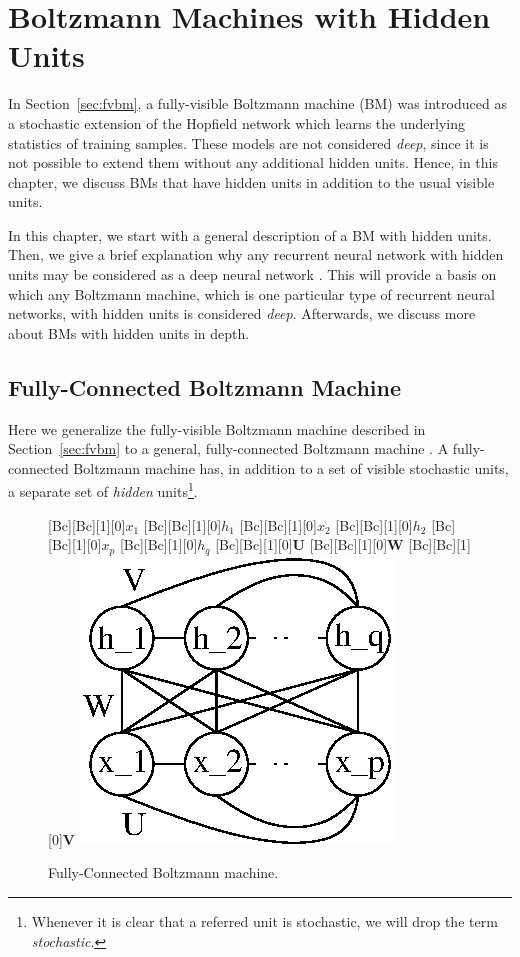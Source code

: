 \documentclass[dissertation,nocontribution,draft*]{aaltoseries}
\newcommand{\matr}[1]{\mathbf{#1}}
\newcommand{\mW}[0]{\matr{W}}
\newcommand{\mU}[0]{\matr{U}}
\newcommand{\mV}[0]{\matr{V}}
\begin{document}
\chapter{Boltzmann Machines with Hidden Units}
\label{chap:bm}

In Section~\ref{sec:fvbm}, a fully-visible Boltzmann machine
(BM) was introduced as a
stochastic extension of the Hopfield network which learns
the underlying statistics of training samples. These models
are not considered \textit{deep}, since it is not possible
to extend them without any additional hidden units. Hence,
in this chapter, we discuss BMs that have hidden units in
addition to the usual visible units.

In this chapter, we start with a general
description of a BM with hidden units. Then, we give  a
brief explanation why any recurrent neural network with
hidden units may be considered as a deep neural network
\citep[see, e.g.,][]{Bengio2013rec}. This will provide a
basis on which any Boltzmann machine, which is one
particular type of recurrent neural networks, with hidden
units is considered \textit{deep}. Afterwards, we discuss
more about BMs with hidden units in depth.

\section{Fully-Connected Boltzmann Machine}
\label{sec:fbm}

Here we generalize the fully-visible Boltzmann machine
described in Section~\ref{sec:fvbm} to a general,
fully-connected Boltzmann machine \citep{Ackley1985}.  A
fully-connected Boltzmann machine has, in addition to a set
of visible stochastic units, a separate set of
\textit{hidden} units\footnote{Whenever it is clear that a
referred unit is stochastic, we will drop the term
\textit{stochastic}.}. 

\begin{figure}
    \centering
    [Bc][Bc][1][0]{$x_1$}
    [Bc][Bc][1][0]{$h_1$}
    [Bc][Bc][1][0]{$x_2$}
    [Bc][Bc][1][0]{$h_2$}
    [Bc][Bc][1][0]{$x_p$}
    [Bc][Bc][1][0]{$h_q$}
    [Bc][Bc][1][0]{$\mU$}
    [Bc][Bc][1][0]{$\mW$}
    [Bc][Bc][1][0]{$\mV$}
    \includegraphics[width=0.4\columnwidth]{figures/fbm.eps}
    \caption{Fully-Connected Boltzmann machine.}
    \label{fig:fbm}
\end{figure}
\end{document}
